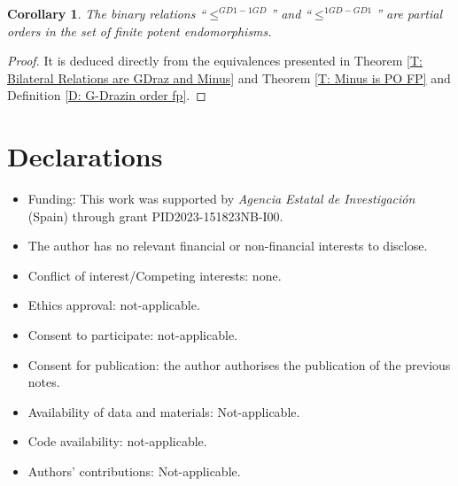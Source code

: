\documentclass[10pt,a4paper]{amsart}
\newtheorem{cor}[defn]{Corollary}
\theoremstyle{plain}
\theoremstyle{remark}
\numberwithin{equation}{section} \numberwithin{defn}{section}
\begin{document}
\begin{cor}
The binary relations ``$\leq^{GD1-1GD}$'' and ``$\leq^{1GD-GD1}$'' are partial orders in the set of finite potent endomorphisms.
\end{cor}
\begin{proof}
It is deduced directly from the equivalences presented in Theorem \ref{T: Bilateral Relations are GDraz and Minus} and Theorem \ref{T: Minus is PO FP} and Definition \ref{D: G-Drazin order fp}.
\end{proof}

\section*{Declarations}


\begin{itemize}
\item Funding: This work was supported by {\it Agencia Estatal de Investigación} (Spain) through grant PID2023-151823NB-I00. 
\item The author has no relevant financial or non-financial interests to disclose.
\item Conflict of interest/Competing interests: none.
\item Ethics approval: not-applicable.
\item Consent to participate: not-applicable.
\item Consent for publication: the author authorises the publication of the previous notes.
\item Availability of data and materials: Not-applicable.
\item Code availability: not-applicable.
\item Authors' contributions: Not-applicable.
\end{itemize}


\medskip











 
\end{document}
